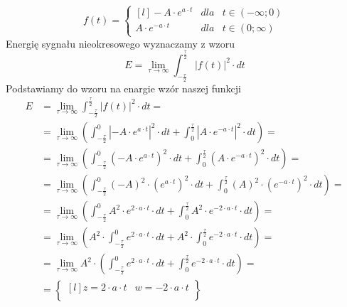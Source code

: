 \begin{task}
\begin{equation}
f(t) = \left\{\begin{matrix*}[l]
-A \cdot e^{a\cdot t} & dla & t \in \left(-\infty; 0\right)\\
A \cdot e^{-a\cdot t} & dla & t \in \left(0; \infty\right)
\end{matrix*}\right.
\end{equation}
Energię sygnału nieokresowego wyznaczamy z wzoru
\begin{equation}
E=\lim_{\tau \rightarrow \infty}\int_{-\frac{\tau}{2}}^{\frac{\tau}{2}}\left|f(t)\right|^2 \cdot dt
\end{equation}
Podstawiamy do wzoru na enargie wzór naszej funkcji
\begin{align*}
E&=\lim_{\tau \rightarrow \infty}\int_{-\frac{\tau}{2}}^{\frac{\tau}{2}}\left|f(t)\right|^2 \cdot dt=\\
 &=\lim_{\tau \rightarrow \infty} \left( 
   \int_{-\frac{\tau}{2}}^{0}\left| -A \cdot e^{a\cdot t} \right|^2 \cdot dt 
 + \int_{0}^{\frac{\tau}{2}}\left| A \cdot e^{-a\cdot t} \right|^2 \cdot dt \right)=\\
 &=\lim_{\tau \rightarrow \infty} \left( 
   \int_{-\frac{\tau}{2}}^{0}\left( -A \cdot e^{a\cdot t} \right)^2 \cdot dt 
 + \int_{0}^{\frac{\tau}{2}}\left( A \cdot e^{-a\cdot t} \right)^2 \cdot dt \right)=\\
 &=\lim_{\tau \rightarrow \infty} \left( 
   \int_{-\frac{\tau}{2}}^{0}\left( -A\right)^2 \cdot \left(e^{a\cdot t} \right)^2 \cdot dt 
 + \int_{0}^{\frac{\tau}{2}}\left( A \right)^2 \cdot \left(e^{-a\cdot t} \right)^2 \cdot dt \right)=\\
 &=\lim_{\tau \rightarrow \infty} \left( 
   \int_{-\frac{\tau}{2}}^{0} A^2 \cdot e^{2\cdot a\cdot t} \cdot dt 
 + \int_{0}^{\frac{\tau}{2}} A^2 \cdot e^{-2 \cdot a\cdot t} \cdot dt \right)=\\
 &=\lim_{\tau \rightarrow \infty} \left( 
    A^2 \cdot \int_{-\frac{\tau}{2}}^{0}  e^{2\cdot a\cdot t} \cdot dt 
 +  A^2 \cdot \int_{0}^{\frac{\tau}{2}} e^{-2 \cdot a\cdot t} \cdot dt \right)=\\
 &=\lim_{\tau \rightarrow \infty} A^2 \cdot \left( 
   \int_{-\frac{\tau}{2}}^{0}  e^{2\cdot a\cdot t} \cdot dt 
 + \int_{0}^{\frac{\tau}{2}} e^{-2 \cdot a\cdot t} \cdot dt \right)=\\
 &=\begin{Bmatrix*}[l]
   z=2\cdot a \cdot t & w=-2 \cdot a \cdot t\\

\end{Bmatrix*}
\end{align*}
\end{task}
